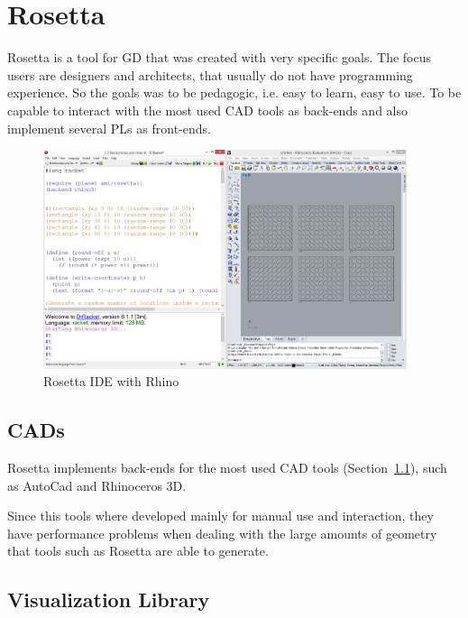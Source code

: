 

\section{Rosetta} %
\label{sec:rosetta}
Rosetta \cite{lopes2011portable} is a tool for \gls{GD} that was created with very specific goals. The focus users are designers and architects, that usually do not have programming experience. So the goals was to be pedagogic, i.e. easy to learn, easy to use. To be capable to interact with the most used \gls{CAD} tools as back-ends and also implement several \glspl{PL} as front-ends.

\begin{figure}[htbp]
	\centering
	\includegraphics[width=0.95\textwidth]{images/Rosetta/Rosetta4.png}
	\caption{Rosetta IDE with Rhino}
	\label{fig:RosettaRhino}
\end{figure}

\subsection{CADs} %
\label{sub:cads}

Rosetta implements back-ends for the most used \gls{CAD} tools (Section~\ref{sub:cads}), such as AutoCad and Rhinoceros 3D. 

Since this tools where developed mainly for manual use and interaction, they have performance problems when dealing with the large amounts of geometry that tools such as Rosetta are able to generate.




\subsection{Visualization Library} %
\label{sub:visualization_library}

